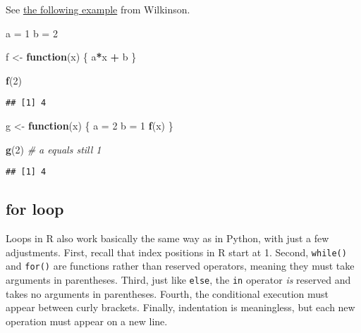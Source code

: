 \documentclass[
]{book}
\newenvironment{Shaded}{\begin{snugshade}}{\end{snugshade}}
\newcommand{\CommentTok}[1]{\textcolor[rgb]{0.56,0.35,0.01}{\textit{#1}}}
\newcommand{\ControlFlowTok}[1]{\textcolor[rgb]{0.13,0.29,0.53}{\textbf{#1}}}
\newcommand{\DecValTok}[1]{\textcolor[rgb]{0.00,0.00,0.81}{#1}}
\newcommand{\KeywordTok}[1]{\textcolor[rgb]{0.13,0.29,0.53}{\textbf{#1}}}
\newcommand{\NormalTok}[1]{#1}
\newcommand{\OperatorTok}[1]{\textcolor[rgb]{0.81,0.36,0.00}{\textbf{#1}}}
\newcommand{\StringTok}[1]{\textcolor[rgb]{0.31,0.60,0.02}{#1}}
\begin{document}
See \href{https://darrenjw.wordpress.com/2011/11/23/lexical-scope-and-function-closures-in-r/}{the following example} from Wilkinson.

\begin{Shaded}
\begin{Highlighting}[]
\NormalTok{a =}\StringTok{ }\DecValTok{1} 
\NormalTok{b =}\StringTok{ }\DecValTok{2}

\NormalTok{f \textless{}{-}}\StringTok{ }\ControlFlowTok{function}\NormalTok{(x)}
\NormalTok{\{}
\NormalTok{  a}\OperatorTok{*}\NormalTok{x }\OperatorTok{+}\StringTok{ }\NormalTok{b}
\NormalTok{\}}

\KeywordTok{f}\NormalTok{(}\DecValTok{2}\NormalTok{)}
\end{Highlighting}
\end{Shaded}

\begin{verbatim}
## [1] 4
\end{verbatim}

\begin{Shaded}
\begin{Highlighting}[]
\NormalTok{g \textless{}{-}}\StringTok{ }\ControlFlowTok{function}\NormalTok{(x)}
\NormalTok{\{}
\NormalTok{  a =}\StringTok{ }\DecValTok{2}
\NormalTok{  b =}\StringTok{ }\DecValTok{1}
  \KeywordTok{f}\NormalTok{(x)}
\NormalTok{\}}

\KeywordTok{g}\NormalTok{(}\DecValTok{2}\NormalTok{) }\CommentTok{\# a equals still 1 }
\end{Highlighting}
\end{Shaded}

\begin{verbatim}
## [1] 4
\end{verbatim}

\hypertarget{for-loop}{%
\subsection{for loop}\label{for-loop}}

Loops in R also work basically the same way as in Python, with just a few adjustments. First, recall that index positions in R start at 1. Second, \texttt{while()} and \texttt{for()} are functions rather than reserved operators, meaning they must take arguments in parentheses. Third, just like \texttt{else}, the \texttt{in} operator \emph{is} reserved and takes no arguments in parentheses. Fourth, the conditional execution must appear between curly brackets. Finally, indentation is meaningless, but each new operation must appear on a new line.
\end{document}
